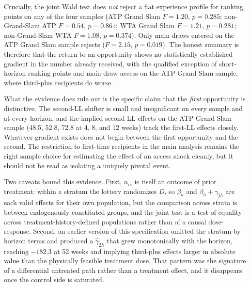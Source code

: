 Crucially, the joint Wald test does \textit{not} reject a flat experience profile for ranking points on any of the four samples (ATP Grand Slam $F = 1.20$, $p = 0.285$; non-Grand-Slam ATP $F = 0.54$, $p = 0.861$; WTA Grand Slam $F = 1.21$, $p = 0.281$; non-Grand-Slam WTA $F = 1.08$, $p = 0.374$). Only main draws entered on the ATP Grand Slam sample rejects ($F = 2.15$, $p = 0.019$). The honest summary is therefore that the return to an opportunity shows no statistically established gradient in the number already received, with the qualified exception of short-horizon ranking points and main-draw access on the ATP Grand Slam sample, where third-plus recipients do worse.

What the evidence does rule out is the specific claim that the \textit{first} opportunity is distinctive. The second-LL shifter is small and insignificant on every sample and at every horizon, and the implied second-LL effects on the ATP Grand Slam sample (48.5, 52.8, 72.8 at 4, 8, and 12 weeks) track the first-LL effects closely. Whatever gradient exists does not begin between the first opportunity and the second. The restriction to first-time recipients in the main analysis remains the right sample choice for estimating the effect of an access shock cleanly, but it should not be read as isolating a uniquely pivotal event.

Two caveats bound this evidence. First, $n_{ie}$ is itself an outcome of prior treatment: within a stratum the lottery randomizes $D$, so $\beta_h$ and $\beta_h + \gamma_{jh}$ are each valid effects for their own population, but the comparison across strata is between endogenously constituted groups, and the joint test is a test of equality across treatment-history-defined populations rather than of a causal dose-response. Second, an earlier version of this specification omitted the stratum-by-horizon terms and produced a $\hat\gamma_{2h}$ that grew monotonically with the horizon, reaching $-182.3$ at 52 weeks and implying third-plus effects larger in absolute value than the physically feasible treatment dose. That pattern was the signature of a differential untreated path rather than a treatment effect, and it disappears once the control side is saturated.

